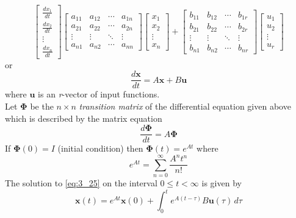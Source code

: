 \documentclass[11pt]{book}
\begin{document}
\begin{equation}
	\begin{bmatrix}
		\frac{dx_1}{dt}\\
		\frac{dx_2}{dt}\\
		\vdots\\
		\frac{dx_n}{dt}
	\end{bmatrix}
	\begin{bmatrix}
		a_{11}&a_{12}&\cdots&a_{1n}\\
		a_{21}&a_{22}&\cdots&a_{2n}\\
		\vdots&\vdots&\ddots&\vdots\\
		a_{n1}&a_{n2}&\cdots&a_{nn}
	\end{bmatrix}
	\begin{bmatrix}
		x_1\\
		x_2\\
		\vdots\\
		x_n
	\end{bmatrix}+
	\begin{bmatrix}
		b_{11}&b_{12}&\cdots&b_{1r}\\
		b_{21}&b_{22}&\cdots&b_{2r}\\
		\vdots&\vdots&\ddots&\vdots\\
		b_{n1}&b_{n2}&\cdots&b_{nr}
	\end{bmatrix}
	\begin{bmatrix}
		u_1\\
		u_2\\
		\vdots\\
		u_r
	\end{bmatrix}
\end{equation}
or
\begin{equation}
	\frac{d\mathbf{x}}{dt}=A\mathbf{x}+B\mathbf{u}\label{eq:3_25}
\end{equation}
where $\mathbf{u}$ is an \emph{r}-vector of input functions.\\
Let $\mathbf{\Phi}$ be the $n\times{n}$ \emph{transition matrix} of the differential equation given above which is described by the matrix equation
\begin{equation}
	\frac{d\mathbf{\Phi}}{dt}=A\mathbf{\Phi}
\end{equation}
If $\mathbf{\Phi}(0)=I$ (initial condition) then $\mathbf{\Phi}(t)=e^{At}$ where
\begin{equation}
	e^{At}=\sum_{n=0}^\infty{\frac{A^nt^n}{n!}}
\end{equation}
The solution to \eqref{eq:3_25} on the interval $0\leq{t}<\infty$ is given by
\begin{equation}
	\mathbf{x}(t)=e^{At}\mathbf{x}(0)+\int_0^t{e^{A(t-\tau)}B\mathbf{u}(\tau)\,d\tau}
\end{equation}
\end{document}
